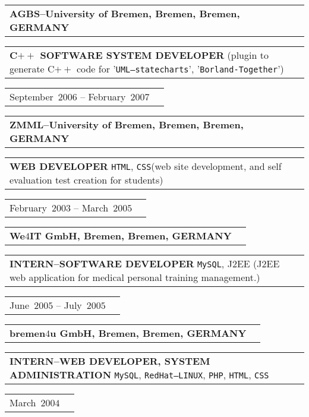 \documentclass[9pt,a4paper]{article} %
\makeatletter
\newcommand{\headerrow}[2]
{\begin{tabular*}{\linewidth}{l@{\extracolsep{\fill}}r}
	#1 &
	#2 \\
\end{tabular*}}
\newcommand{\headerrowONE}[1]{\headerrow{#1}{}}
\newcommand{\css}{\texttt{CSS}\xspace}
\newcommand{\php}{\texttt{PHP}\xspace}
\newcommand{\mysql}{\texttt{MySQL}\xspace}
\newcommand{\redhat}{\texttt{RedHat--LINUX}\xspace}
\newcommand{\html}{\texttt{HTML}\xspace}
\newcommand{\jtwoee}{J$2$EE\xspace}
\newcommand{\cplusplus}{C$++$\xspace}
\newcommand{\cvitemdate}[2]{#1~$#2$\xspace}
\newcommand{\cvitempositionheld}[1]{\textbf{#1}\xspace}
\makeatother
\begin{document}
\vspace{0.3em}

\headerrowONE{\textbf{AGBS--University of Bremen, Bremen, Bremen, GERMANY}}	
\headerrowONE{\cvitempositionheld{\cplusplus SOFTWARE SYSTEM DEVELOPER}
(plugin to generate \cplusplus code for '\texttt{UML--statecharts}',
'\texttt{Borland-Together}')}
\headerrowONE{\cvitemdate{September}{2006} -- \cvitemdate{February}{2007}}	

\vspace{0.3em}

\headerrowONE{\textbf{ZMML--University of Bremen, Bremen, Bremen, GERMANY}}	
\headerrowONE{\cvitempositionheld{WEB DEVELOPER} \html, \css (web site development,
and self evaluation test creation for students)}
\headerrowONE{\cvitemdate{February}{2003} -- \cvitemdate{March}{2005}}	

\vspace{0.3em}

\headerrowONE{\textbf{We$4$IT GmbH, Bremen, Bremen, GERMANY}}	
\headerrowONE{\cvitempositionheld{INTERN--SOFTWARE DEVELOPER} \mysql, \jtwoee
(\jtwoee web application for medical personal training management.)}
\headerrowONE{\cvitemdate{June}{2005} -- \cvitemdate{July}{2005}}
	
\vspace{0.3em}

\headerrowONE{\textbf{bremen$4$u GmbH, Bremen, Bremen, GERMANY}}	
\headerrowONE{\cvitempositionheld{INTERN--WEB DEVELOPER, SYSTEM ADMINISTRATION} \mysql, \redhat, \php,
\html, \css}
\headerrowONE{\cvitemdate{March}{2004}}	

\vspace{2em}
	
\end{document}
